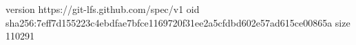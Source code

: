 version https://git-lfs.github.com/spec/v1
oid sha256:7eff7d155223c4ebdfae7bfce1169720f31ee2a5cfdbd602e57ad615ce00865a
size 110291
